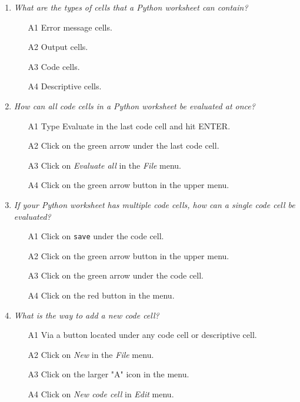 \begin{enumerate}
\item {\em What are the types of cells that a Python worksheet can contain?}\\

\begin{enumerate}
\item[A1] Error message cells.
\item[A2] Output cells.
\item[A3] Code cells.
\item[A4] Descriptive cells.
\end{enumerate}
\vspace{4mm}

\item {\em How can all code cells in a Python worksheet be evaluated at once?}\\

\begin{enumerate}
\item[A1] Type Evaluate in the last code cell and hit ENTER.
\item[A2] Click on the green arrow under the last code cell.
\item[A3] Click on {\em Evaluate all} in the {\em File} menu. 
\item[A4] Click on the green arrow button in the upper menu.
\end{enumerate}
\vspace{4mm}

\item {\em If your Python worksheet has multiple code cells, 
how can a single code cell be evaluated?}\\

\begin{enumerate}
\item[A1] Click on {\tt save} under the code cell.
\item[A2] Click on the green arrow button in the upper menu.
\item[A3] Click on the green arrow under the code cell.
\item[A4] Click on the red button in the menu.
\end{enumerate}
\vspace{4mm}

\item {\em What is the way to add a new code cell?}\\

\begin{enumerate}
\item[A1] Via a button located under any code cell or descriptive cell. 
\item[A2] Click on {\em New} in the {\em File} menu.
\item[A3] Click on the larger "A" icon in the menu.
\item[A4] Click on {\em New code cell} in {\em Edit} menu.
\end{enumerate}
\vspace{4mm}


\end{enumerate}
